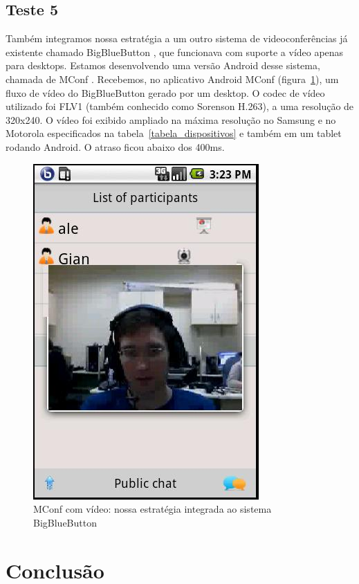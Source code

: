\documentclass{acm_proc_article-sp}
\begin{document}
\subsection{Teste 5}
Também integramos nossa estratégia a um outro sistema de videoconferências já existente chamado BigBlueButton \cite{bbb}, que funcionava com suporte a vídeo apenas para desktops. Estamos desenvolvendo uma versão Android desse sistema, chamada de MConf \cite{mconf}. Recebemos, no aplicativo Android MConf (figura~\ref{figura_mconf}), um fluxo de vídeo do BigBlueButton gerado por um desktop. O codec de vídeo utilizado foi FLV1 (também conhecido como Sorenson H.263), a uma resolução de 320x240. O vídeo foi exibido ampliado na máxima resolução no Samsung e no Motorola especificados na tabela~\ref{tabela_dispositivos} e também em um tablet rodando Android. O atraso ficou abaixo dos 400ms.
\begin{figure}
 \centering
 \includegraphics[scale=0.38]{./mconf.jpg}
\caption{MConf com vídeo: nossa estratégia integrada ao sistema BigBlueButton}\label{figura_mconf}
\end{figure}


\section{Conclusão}
\end{document}

